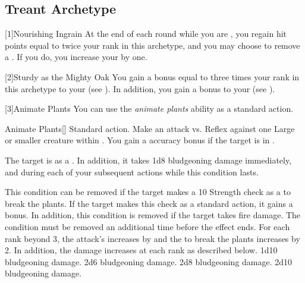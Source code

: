     \subsection{Treant Archetype}

        [1]{Nourishing Ingrain} At the end of each round while you are , you regain hit points equal to twice your rank in this archetype, and you may choose to remove a .
        If you do, you increase your  by one.

        [2]{Sturdy as the Mighty Oak} You gain a bonus equal to three times your rank in this archetype to your  (see ).
        In addition, you gain a  bonus to your  (see ).

        [3]{Animate Plants} You can use the \textit{animate plants} ability as a standard action.
        \begin{activeability}{Animate Plants}[]
            \abilityusagetime Standard action.
            \rankline
            Make an attack vs. Reflex against one Large or smaller  creature within \medrange.
            You gain a  accuracy bonus if the target is in .

            \hit The target is \slowed as a .
            In addition, it takes 1d8 bludgeoning damage immediately, and during each of your subsequent actions while this condition lasts.

            This condition can be removed if the target makes a  10 Strength check as a  to break the plants.
            If the target makes this check as a standard action, it gains a  bonus.
            In addition, this condition is removed if the target takes fire damage.
            \crit The condition must be removed an additional time before the effect ends.
            \rankline
            For each rank beyond 3, the attack's  increases by  and the  to break the plants increases by 2.
            In addition, the damage increases at each rank as described below.
             1d10 bludgeoning damage.
             2d6 bludgeoning damage.
             2d8 bludgeoning damage.
             2d10 bludgeoning damage.
        \end{activeability}

